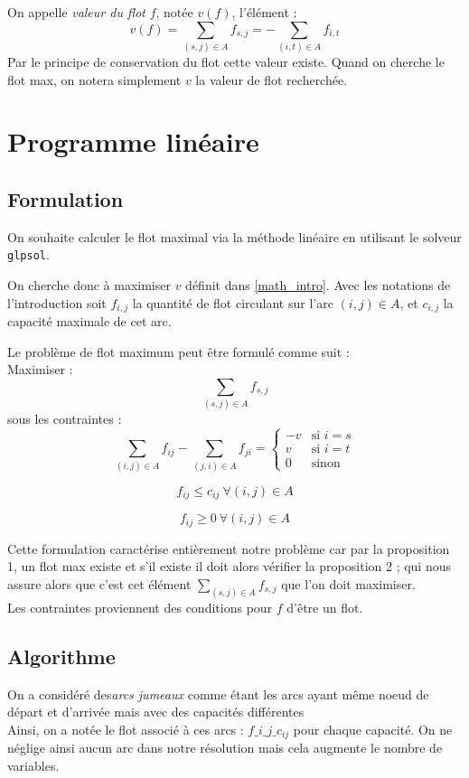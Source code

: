 \documentclass{article}[12pt]
\begin{document}
     
    On appelle {\it valeur du flot} $f$, notée $v(f)$, l'élément : $$v(f) = \sum_{(s,j) \in A} f_{s,j} = -\sum_{(i,t) \in A} f_{i,t}$$
    Par le principe de conservation du flot cette valeur existe. Quand on cherche le flot max, on notera simplement $v$ la valeur de flot recherchée. 


\section{Programme linéaire}
    
\subsection{Formulation}

On souhaite calculer le flot maximal via la méthode linéaire en utilisant le solveur \texttt{glpsol}.

On cherche donc à maximiser $v$ définit dans \ref{math_intro}.
Avec les notations de l'introduction soit $f_{i,j}$ la quantité de flot circulant sur l'arc $(i,j) \in A$, et $c_{i,j}$ la capacité maximale de cet arc.

Le problème de flot maximum peut être formulé comme suit : \\
Maximiser :
$$\sum_{(s,j) \in A} f_{s,j}$$
sous les contraintes :
$$\sum_{(i,j) \in A} f_{ij} - \sum_{(j,i) \in A} f_{ji} =
\begin{cases}
-v & \text{si } i=s \\
v & \text{si } i=t \\
0 & \text{sinon}
\end{cases}$$

$$f_{ij} \leq c_{ij} ~ \forall (i,j) \in A$$

$$f_{ij} \geq 0 ~ \forall (i,j) \in A $$

Cette formulation caractérise entièrement notre problème car par la proposition 1, un flot max existe et s'il existe il doit alors vérifier la proposition 2 ; qui nous assure alors que c'est cet élément $\sum_{(s,j) \in A} f_{s,j}$ que l'on doit maximiser. \\
Les contraintes proviennent des conditions pour $f$ d'être un flot.\\

\subsection{Algorithme}

On a considéré des{\it arcs jumeaux} comme étant les arcs ayant même noeud de départ et d'arrivée mais avec des capacités différentes\\
Ainsi, on a notée le flot associé à ces arcs : $f\_i\_j\_c_{ij}$ pour chaque capacité. On ne néglige ainsi aucun arc dans notre résolution mais cela augmente le nombre de variables.\\
\end{document}

